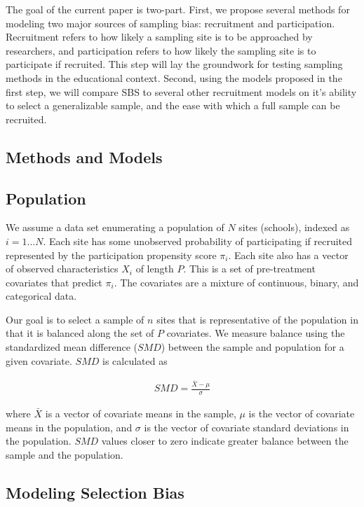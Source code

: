 \documentclass[man,floatsintext]{apa6}
\theoremstyle{definition}
\theoremstyle{definition}
\theoremstyle{definition}
\theoremstyle{remark}
\begin{document}
The goal of the current paper is two-part. First, we propose several
methods for modeling two major sources of sampling bias: recruitment and
participation. Recruitment refers to how likely a sampling site is to be
approached by researchers, and participation refers to how likely the
sampling site is to participate if recruited. This step will lay the
groundwork for testing sampling methods in the educational context.
Second, using the models proposed in the first step, we will compare SBS
to several other recruitment models on it's ability to select a
generalizable sample, and the ease with which a full sample can be
recruited.

\hypertarget{methods-and-models}{%
\subsection{Methods and Models}\label{methods-and-models}}

\hypertarget{population}{%
\subsection{Population}\label{population}}

We assume a data set enumerating a population of \(N\) sites (schools),
indexed as \(i = 1 ... N\). Each site has some unobserved probability of
participating if recruited represented by the participation propensity
score \(\pi_i\). Each site also has a vector of observed characteristics
\(X_i\) of length \(P\). This is a set of pre-treatment covariates that
predict \(\pi_i\). The covariates are a mixture of continuous, binary,
and categorical data.

Our goal is to select a sample of \(n\) sites that is representative of
the population in that it is balanced along the set of \(P\) covariates.
We measure balance using the standardized mean difference (\(SMD\))
between the sample and population for a given covariate. \(SMD\) is
calculated as

\begin{align}
  SMD = \frac{\bar{X}-\mu}{\sigma}
\end{align}

where \(\bar{X}\) is a vector of covariate means in the sample, \(\mu\)
is the vector of covariate means in the population, and \(\sigma\) is
the vector of covariate standard deviations in the population. \(SMD\)
values closer to zero indicate greater balance between the sample and
the population.

\hypertarget{modeling-selection-bias}{%
\subsection{Modeling Selection Bias}\label{modeling-selection-bias}}
\end{document}
